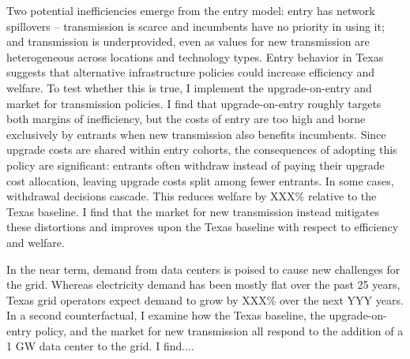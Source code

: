 \documentclass[12pt]{article}
\begin{document}
Two potential inefficiencies emerge from the entry model: entry has network spillovers -- transmission is scarce and incumbents have no priority in using it; and transmission is underprovided, even as values for new transmission are heterogeneous across locations and technology types. Entry behavior in Texas suggests that alternative infrastructure policies could increase efficiency and welfare. To test whether this is true, I implement the upgrade-on-entry and market for transmission policies. I find that upgrade-on-entry roughly targets both margins of inefficiency, but the costs of entry are too high and borne exclusively by entrants when new transmission also benefits incumbents. Since upgrade costs are shared within entry cohorts, the consequences of adopting this policy are significant: entrants often withdraw instead of paying their upgrade cost allocation, leaving upgrade costs split among fewer entrants. In some cases, withdrawal decisions cascade. This reduces welfare by XXX\% relative to the Texas baseline. I find that the market for new transmission instead mitigates these distortions and improves upon the Texas baseline with respect to efficiency and welfare. 

In the near term, demand from data centers is poised to cause new challenges for the grid. Whereas electricity demand has been mostly flat over the past 25 years, Texas grid operators expect demand to grow by XXX\% over the next YYY years. In a second counterfactual, I examine how the Texas baseline, the upgrade-on-entry policy, and the market for new transmission all respond to the addition of a 1 GW data center to the grid. I find....

\end{document}
